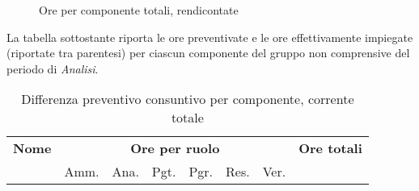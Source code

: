 \begin{figure}[H]
\caption{Ore per componente totali, rendicontate}
\end{figure}

La tabella sottostante riporta le ore preventivate e le ore effettivamente impiegate (riportate tra parentesi) per ciascun componente del gruppo \GroupName{} non comprensive del periodo di \textit{Analisi}.

\begin{center}
\begin{table}[H]
\begin{tabular}{lccccccc}
\toprule
    \textbf{Nome}  & \multicolumn{6}{c}{\textbf{Ore per ruolo}} & \textbf{Ore totali} \\
     & Amm. & Ana. & Pgt. & Pgr. & Res. & Ver. & \\
    \midrule
    
    	
    
    \bottomrule
\end{tabular}
\caption{Differenza preventivo consuntivo per componente, corrente totale}
\end{table}
\end{center}
